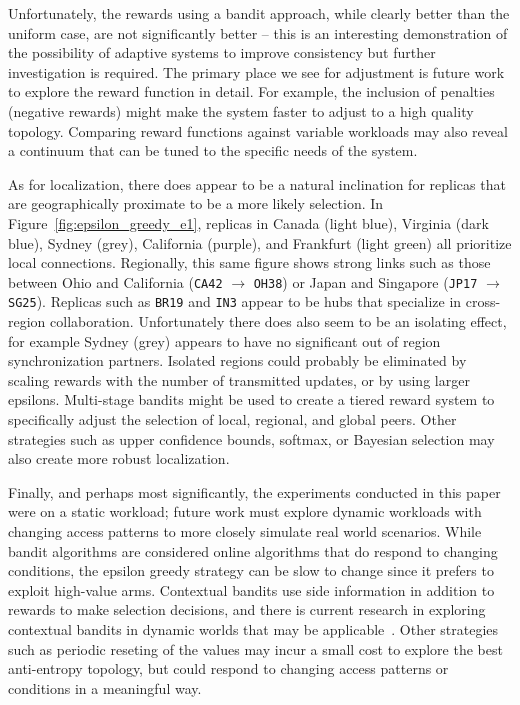 Unfortunately, the rewards using a bandit approach, while clearly better
than the uniform case, are not significantly better -- this is an interesting
demonstration of the possibility of adaptive systems to improve consistency
but further investigation is required.
The primary place we see for adjustment is future work to explore the reward
function in detail.
For example, the inclusion of penalties (negative rewards) might make
the system faster to adjust to a high quality topology.
Comparing reward functions against variable workloads may also reveal a
continuum that can be tuned to the specific needs of the system.

As for localization, there does appear to be a natural inclination for
replicas that are geographically proximate to be a more likely selection.
In Figure~\ref{fig:epsilon_greedy_e1}, replicas in Canada (light blue),
Virginia (dark blue), Sydney (grey), California (purple), and Frankfurt
(light green) all prioritize local connections.
Regionally, this same figure shows strong links such as those between Ohio
and California (\texttt{CA42} $\rightarrow$ \texttt{OH38}) or Japan and
Singapore (\texttt{JP17} $\rightarrow$ \texttt{SG25}).
Replicas such as \texttt{BR19} and \texttt{IN3} appear to be hubs that
specialize in cross-region collaboration.
Unfortunately there does also seem to be an isolating effect, for example
Sydney (grey) appears to have no significant out of region synchronization
partners.
Isolated regions could probably be eliminated by scaling rewards with
the number of transmitted updates, or by using larger epsilons.
Multi-stage bandits might be used to create a tiered reward system to
specifically adjust the selection of local, regional, and global peers.
Other strategies such as upper confidence bounds, softmax, or Bayesian
selection may also create more robust localization.

Finally, and perhaps most significantly, the experiments conducted in
this paper were on a static workload; future work must explore dynamic
workloads with changing access patterns to more closely simulate real
world scenarios.
While bandit algorithms are considered online algorithms that do respond
to changing conditions, the epsilon greedy strategy can be slow to change
since it prefers to exploit high-value arms.
Contextual bandits use side information in addition to rewards to make
selection decisions, and there is current research in exploring contextual
bandits in dynamic worlds that may be applicable~\cite{contextual_bandits}.
Other strategies such as periodic reseting of the values may incur a small
cost to explore the best anti-entropy topology, but could respond to changing
access patterns or conditions in a meaningful way.

